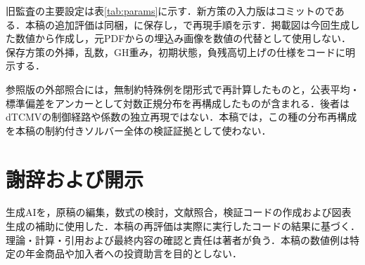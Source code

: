 \documentclass[11pt,a4paper]{article}
\numberwithin{equation}{section}
\numberwithin{table}{section}
\numberwithin{figure}{section}
\theoremstyle{plain}
\theoremstyle{definition}
\begin{document}
旧監査の主要設定は表\ref{tab:params}に示す．新方策の入力版はコミットのである．本稿の追加評価は同梱，に保存し，で再現手順を示す．掲載図は今回生成した数値から作成し，元PDFからの埋込み画像を数値の代替として使用しない．保存方策の外挿，乱数，GH重み，初期状態，負残高切上げの仕様をコードに明示する．

参照版の外部照合には，無制約特殊例を閉形式で再計算したものと，公表平均・標準偏差をアンカーとして対数正規分布を再構成したものが含まれる．後者はdTCMVの制御経路や係数の独立再現ではない．本稿では，この種の分布再構成を本稿の制約付きソルバー全体の検証証拠として使わない．

\section*{謝辞および開示}
生成AIを，原稿の編集，数式の検討，文献照合，検証コードの作成および図表生成の補助に使用した．本稿の再評価は実際に実行したコードの結果に基づく．理論・計算・引用および最終内容の確認と責任は著者が負う．本稿の数値例は特定の年金商品や加入者への投資助言を目的としない．
\end{document}
